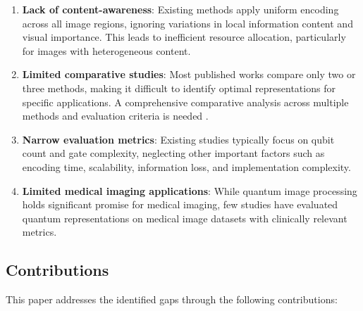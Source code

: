 \documentclass{ipol}
\begin{document}
\begin{enumerate}
\item \textbf{Lack of content-awareness}: Existing methods apply uniform encoding across all image regions, ignoring variations in local information content and visual importance. This leads to inefficient resource allocation, particularly for images with heterogeneous content.

\item \textbf{Limited comparative studies}: Most published works compare only two or three methods, making it difficult to identify optimal representations for specific applications. A comprehensive comparative analysis across multiple methods and evaluation criteria is needed \cite{bib42}.

\item \textbf{Narrow evaluation metrics}: Existing studies typically focus on qubit count and gate complexity, neglecting other important factors such as encoding time, scalability, information loss, and implementation complexity.

\item \textbf{Limited medical imaging applications}: While quantum image processing holds significant promise for medical imaging, few studies have evaluated quantum representations on medical image datasets with clinically relevant metrics.
\end{enumerate}

\subsection{Contributions}

This paper addresses the identified gaps through the following contributions:
\end{document}
